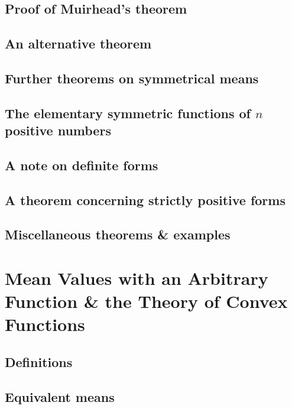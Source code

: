 \documentclass[oneside]{book}
\numberwithin{equation}{section}
\begin{document}
\subsection{Proof of Muirhead's theorem}

\subsection{An alternative theorem}

\subsection{Further theorems on symmetrical means}

\subsection{The elementary symmetric functions of $n$ positive numbers}

\subsection{A note on definite forms}

\subsection{A theorem concerning strictly positive forms}

\subsection{Miscellaneous theorems \& examples}


\section{Mean Values with an Arbitrary Function \& the Theory of Convex Functions}

\subsection{Definitions}

\subsection{Equivalent means}
\end{document}
